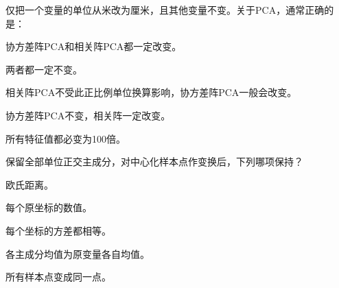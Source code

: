 \par\addvspace{6pt}\noindent\begin{minipage}{\linewidth}


仅把一个变量的单位从米改为厘米，且其他变量不变。关于PCA，通常正确的是：


\begin{choices}

\item 协方差阵PCA和相关阵PCA都一定改变。

\item 两者都一定不变。

\item 相关阵PCA不受此正比例单位换算影响，协方差阵PCA一般会改变。

\item 协方差阵PCA不变，相关阵一定改变。

\item 所有特征值都必变为100倍。

\end{choices}

\end{minipage}\par\vspace{4pt}

\par\addvspace{6pt}\noindent\begin{minipage}{\linewidth}


保留全部单位正交主成分，对中心化样本点作变换后，下列哪项保持？


\begin{choices}

\item 欧氏距离。

\item 每个原坐标的数值。

\item 每个坐标的方差都相等。

\item 各主成分均值为原变量各自均值。

\item 所有样本点变成同一点。

\end{choices}

\end{minipage}\par\vspace{4pt}

